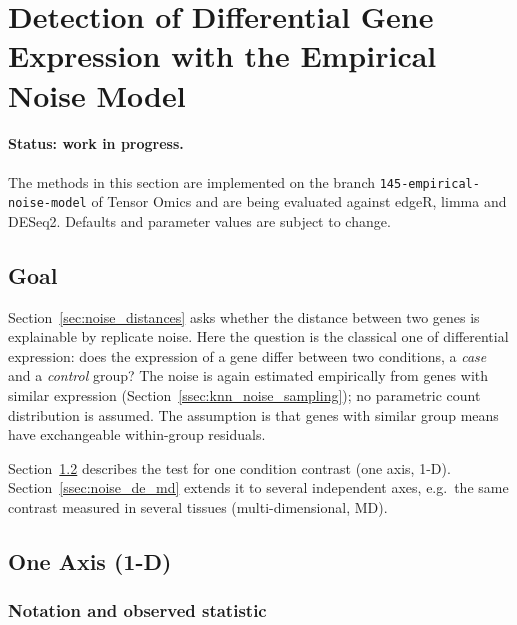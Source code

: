 \section{Detection of Differential Gene Expression with the Empirical Noise Model}\label{sec:noise_de}

    \paragraph{Status: work in progress.} The methods in this section are implemented on the branch \texttt{145-empirical-noise-model} of Tensor Omics and are being evaluated against edgeR, limma and DESeq2. Defaults and parameter values are subject to change.

    \subsection{Goal}

        Section~\ref{sec:noise_distances} asks whether the distance between two genes is explainable by replicate noise. Here the question is the classical one of differential expression: does the expression of a gene differ between two conditions, a \emph{case} and a \emph{control} group? The noise is again estimated empirically from genes with similar expression (Section~\ref{ssec:knn_noise_sampling}); no parametric count distribution is assumed. The assumption is that genes with similar group means have exchangeable within-group residuals.

        Section~\ref{ssec:noise_de_1d} describes the test for one condition contrast (one axis, 1-D). Section~\ref{ssec:noise_de_md} extends it to several independent axes, e.g.\ the same contrast measured in several tissues (multi-dimensional, MD).

    \subsection{One Axis (1-D)}\label{ssec:noise_de_1d}

        \subsubsection{Notation and observed statistic}

